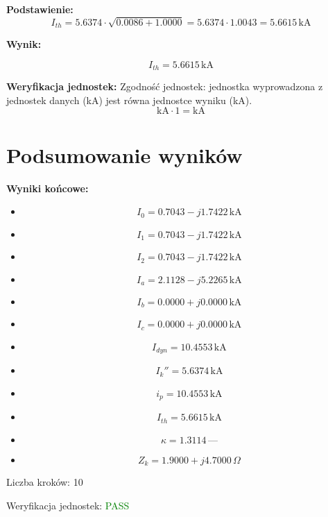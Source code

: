 \documentclass[11pt,a4paper]{article}
\begin{document}
\textbf{Podstawienie:}
$$
I_{th} = 5.6374 \cdot \sqrt{0.0086 + 1.0000} = 5.6374 \cdot 1.0043 = 5.6615\,\text{kA}
$$

\textbf{Wynik:}
\begin{center}
$$
I_{th} = 5.6615\,\mathrm{kA}
$$
\end{center}

\textbf{Weryfikacja jednostek:} Zgodność jednostek: jednostka wyprowadzona z jednostek danych (kA) jest równa jednostce wyniku (kA).
$$
\mathrm{kA} \cdot 1 = \mathrm{kA}
$$

\section{Podsumowanie wyników}

\textbf{Wyniki końcowe:}
\begin{itemize}
  \item
$$
I_0 = 0.7043 - j1.7422\,\mathrm{kA}
$$
  \item
$$
I_1 = 0.7043 - j1.7422\,\mathrm{kA}
$$
  \item
$$
I_2 = 0.7043 - j1.7422\,\mathrm{kA}
$$
  \item
$$
I_a = 2.1128 - j5.2265\,\mathrm{kA}
$$
  \item
$$
I_b = 0.0000 + j0.0000\,\mathrm{kA}
$$
  \item
$$
I_c = 0.0000 + j0.0000\,\mathrm{kA}
$$
  \item
$$
I_{dyn} = 10.4553\,\mathrm{kA}
$$
  \item
$$
I_k'' = 5.6374\,\mathrm{kA}
$$
  \item
$$
i_p = 10.4553\,\mathrm{kA}
$$
  \item
$$
I_{th} = 5.6615\,\mathrm{kA}
$$
  \item
$$
\kappa = 1.3114\,\text{—}
$$
  \item
$$
Z_k = 1.9000 + j4.7000\,\Omega
$$
\end{itemize}

Liczba kroków: 10

Weryfikacja jednostek: \textcolor{green}{PASS}
\end{document}
